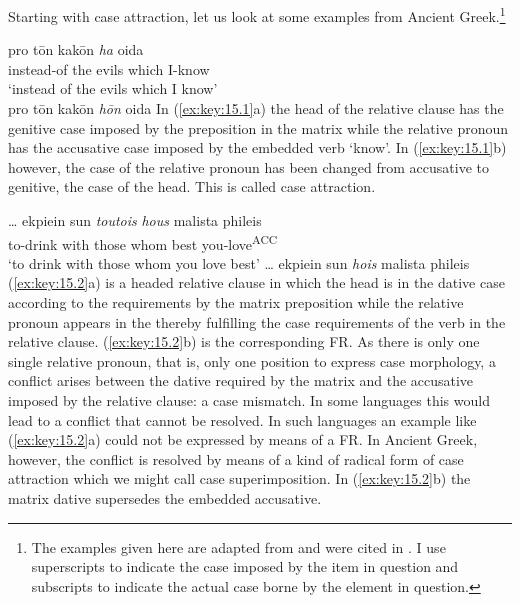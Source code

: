 \documentclass[output=paper]{langsci/langscibook}
\begin{document}
\begin{refcontext}
Starting with case attraction, let us look at some examples from Ancient
Greek.\footnote{The examples given here are adapted from
    \textcite{Hirschbuhler1976} and were cited in
    \citet{GroosVanRiemsdijk1981}. I use superscripts to indicate the case
    imposed by the item in question and subscripts to indicate the actual case
borne by the element in question.}

\ea\label{ex:key:15.1}
    \ea
        \gll    pro t\=on kak\=on \emph{ha} oida\\
                instead-of\textsuperscript{\Gen{}}  the evils\tss{\Gen{}}   which\tss{\Acc{}} I-know\textsuperscript{\Acc{}} \\
        \glt    ‘instead of the evils which I know’\\
    \ex pro\textsuperscript{\Gen{}}  t\=on kak\=on\tss{\Gen{}}  \emph{h\=on}\tss{\Gen{}} oida\textsuperscript{\Acc{}}
    \z
\z
In (\ref{ex:key:15.1}a) the head of the relative clause has the genitive case imposed by the
preposition in the matrix while the relative pronoun has the accusative
case imposed by the embedded verb ‘know’. In (\ref{ex:key:15.1}b) however, the case of the
relative pronoun has been changed from accusative to genitive, the case of the
head. This is called case attraction.

\ea\label{ex:key:15.2}
    \ea
        \gll    \dots{} ekpiein  sun         \emph{toutois}    \emph{hous}        malista phileis\\
                {} to-drink with\textsuperscript{\Dat{}} those\tss{\Dat{}} whom\tss{\Acc{}} best you-love\textsuperscript{ACC}\\
        \glt    ‘to drink with those whom you love best’
    \ex \dots{} ekpiein sun\textsuperscript{\Dat{}} \emph{hois}\tss{\Dat{}} malista phileis\textsuperscript{\Acc{}}
    \z
\z
(\ref{ex:key:15.2}a) is a headed relative clause in which the head is in the dative case
according to the requirements by the matrix preposition while the relative
pronoun appears in the  thereby fulfilling the case requirements
of the verb in the relative clause. (\ref{ex:key:15.2}b) is the corresponding FR\@. As there is
only one single relative pronoun, that is, only one position to express case
morphology, a conflict arises between the dative required by the matrix and the
accusative imposed by the relative clause: a case mismatch. In some languages
this would lead to a conflict that cannot be resolved. In such languages an
example like (\ref{ex:key:15.2}a) could not be expressed by means of a FR\@. In Ancient Greek,
however, the conflict is resolved by means of a kind of radical form of case
attraction which we might call case superimposition. In (\ref{ex:key:15.2}b) the matrix dative
supersedes the embedded accusative.


\end{refcontext}
\end{document}
